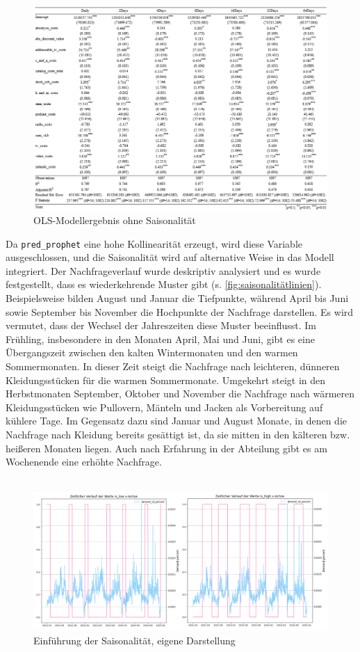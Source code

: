 \begin{figure}[H]
    \centering
    \includegraphics[width=1\linewidth]{images/ols2.png}
    \caption{\ac{OLS}-Modellergebnis ohne Saisonalität}
    \label{fig:OLSohneSaison}
\end{figure}
\noindent
Da \verb|pred_prophet| eine hohe Kollinearität erzeugt, wird diese Variable ausgeschlossen, und die Saisonalität wird auf alternative Weise in das Modell integriert. Der Nachfrageverlauf wurde deskriptiv analysiert und es wurde festgestellt, dass es wiederkehrende Muster gibt (s. \autoref{fig:saisonalitätlinien}). Beispielsweise bilden August und Januar die Tiefpunkte, während April bis Juni sowie September bis November die Hochpunkte der Nachfrage darstellen. Es wird vermutet, dass der Wechsel der Jahreszeiten diese Muster beeinflusst. Im Frühling, insbesondere in den Monaten April, Mai und Juni, gibt es eine Übergangszeit zwischen den kalten Wintermonaten und den warmen Sommermonaten. In dieser Zeit steigt die Nachfrage nach leichteren, dünneren Kleidungsstücken für die warmen Sommermonate. Umgekehrt steigt in den Herbstmonaten September, Oktober und November die Nachfrage nach wärmeren Kleidungsstücken wie Pullovern, Mänteln und Jacken als Vorbereitung auf kühlere Tage. Im Gegensatz dazu sind Januar und August Monate, in denen die Nachfrage nach Kleidung bereits gesättigt ist, da sie mitten in den kälteren bzw. heißeren Monaten liegen. Auch nach Erfahrung in der Abteilung gibt es am Wochenende eine erhöhte Nachfrage. \\\\
\begin{figure}[H]
    \centering
    \includegraphics[width=1\linewidth]{images/nachfrageverlauf.png}
    \caption{Einführung der Saisonalität, eigene Darstellung}
    \label{fig:saisonalitätlinien}
\end{figure}
